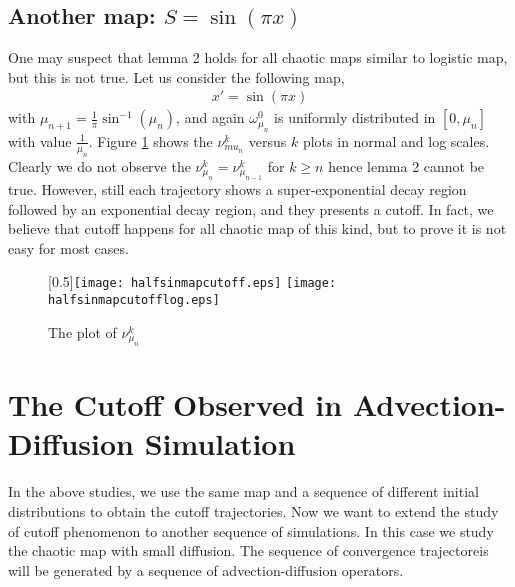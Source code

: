   
\subsection{Another map: $S= \sin(\pi x)$}
One may suspect that lemma 2 holds for all chaotic maps similar to logistic map, but this is not true. Let us consider the following map,
 \begin{eqnarray}
    x' = \sin(\pi x)
 \end{eqnarray}
with $\mu_{n+1} = \frac{1}{\pi}\sin^{-1}(\mu_{n})$, and again $\omega_{\mu_n}^0$ is uniformly distributed in $[0, \mu_n]$ with value $\frac{1}{\mu_n}$. Figure \ref{halfsinmapcutoff} shows the $\nu_{mu_n}^k$ versus $k$ plots in normal and log scales. Clearly we do not observe the $\nu_{\mu_n}^k = \nu_{\mu_{n-1}}^{k}$ for $k \ge n$ hence lemma 2 cannot be true. However, still each trajectory shows a super-exponential decay region followed by an exponential decay region, and they presents a cutoff. In fact, we believe that cutoff happens for all chaotic map of this kind, but to prove it is not easy for most cases.  

\begin{figure}
\caption{\label{halfsinmapcutoff} The plot of $\nu_{\mu_n}^k$}
\centerline{\scalebox{0.5}[0.5]{\texttt{[image: halfsinmapcutoff.eps]}
                                \texttt{[image: halfsinmapcutofflog.eps]}}}
\end{figure}





\section{The Cutoff Observed in Advection-Diffusion Simulation}
In the above studies, we use the same map and a sequence of different initial distributions to obtain the cutoff trajectories. Now we want to extend the study of cutoff phenomenon to another sequence of simulations. In this case we study the chaotic map with small diffusion. The sequence of convergence trajectoreis will be generated by a sequence of advection-diffusion operators. 




